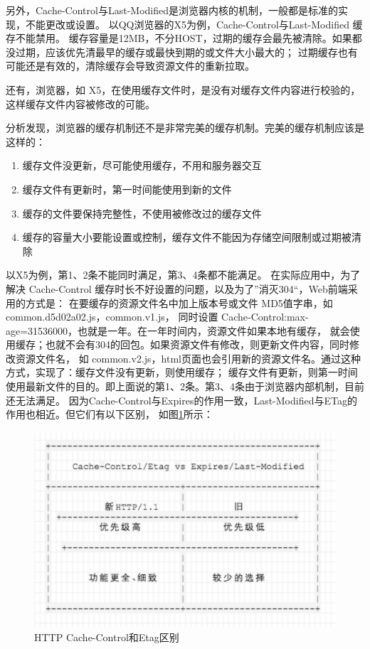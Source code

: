 \documentclass{book}
\begin{document}
另外，Cache-Control与Last-Modified是浏览器内核的机制，一般都是标准的实现，不能更改或设置。
以QQ浏览器的X5为例，Cache-Control与Last-Modified 缓存不能禁用。
缓存容量是12MB，不分HOST，过期的缓存会最先被清除。如果都没过期，应该优先清最早的缓存或最快到期的或文件大小最大的；
过期缓存也有可能还是有效的，清除缓存会导致资源文件的重新拉取。

还有，浏览器，如 X5，在使用缓存文件时，是没有对缓存文件内容进行校验的，这样缓存文件内容被修改的可能。

分析发现，浏览器的缓存机制还不是非常完美的缓存机制。完美的缓存机制应该是这样的：

\begin{enumerate}
\setcounter{enumi}{0}
\item{缓存文件没更新，尽可能使用缓存，不用和服务器交互}
\item{缓存文件有更新时，第一时间能使用到新的文件}
\item{缓存的文件要保持完整性，不使用被修改过的缓存文件}
\item{缓存的容量大小要能设置或控制，缓存文件不能因为存储空间限制或过期被清除}
\end{enumerate}

以X5为例，第1、2条不能同时满足，第3、4条都不能满足。
在实际应用中，为了解决 Cache-Control 缓存时长不好设置的问题，以及为了”消灭304“，Web前端采用的方式是：
在要缓存的资源文件名中加上版本号或文件 MD5值字串，如 common.d5d02a02.js，common.v1.js，
同时设置 Cache-Control:max-age=31536000，也就是一年。在一年时间内，资源文件如果本地有缓存，
就会使用缓存；也就不会有304的回包。如果资源文件有修改，则更新文件内容，同时修改资源文件名，
如 common.v2.js，html页面也会引用新的资源文件名。通过这种方式，实现了：缓存文件没有更新，则使用缓存；
缓存文件有更新，则第一时间使用最新文件的目的。即上面说的第1、2条。第3、4条由于浏览器内部机制，目前还无法满足。
因为Cache-Control与Expires的作用一致，Last-Modified与ETag的作用也相近。但它们有以下区别，
如图\ref{fig:HttpCacheControlEtag}所示：

\begin{figure}[!b]
	\centering
	\includegraphics[scale=1]{HttpCacheControlEtag.jpg}
	\caption{HTTP Cache-Control和Etag区别}
	\label{fig:HttpCacheControlEtag}
\end{figure}
\end{document}

